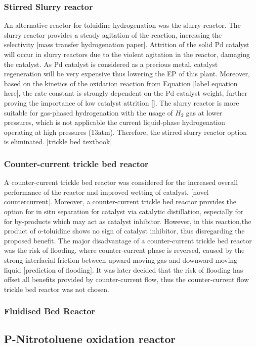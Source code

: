 \subsubsection{Stirred Slurry reactor}
An alternative reactor for toluidine hydrogenation was the slurry reactor. The slurry reactor provides a steady agitation of the reaction, increasing the selectivity [mass transfer hydrogenation paper]. Attrition of the solid Pd catalyst will occur in slurry reactors due to the violent agitation in the reactor, damaging the catalyst. As Pd catalyst is considered as a precious metal, catalyst regeneration will be very expensive thus lowering the EP of this plant. Moreover, based on the kinetics of the oxidation reaction from Equation [label equation here], the rate constant is strongly dependent on the Pd catalyst weight, further proving the importance of low catalyst attrition [].
The slurry reactor is more suitable for gas-phased hydrogenation with the usage of $H_2$ gas at lower pressures, which is not applicable the current liquid-phase hydrogenation operating at high pressures (13atm). Therefore, the stirred slurry reactor option is eliminated. [trickle bed textbook]

\subsubsection{Counter-current trickle bed reactor}
A counter-current trickle bed reactor was considered for the increased overall performance of the reactor and improved wetting of catalyst. [novel countercurrent]. Moreover, a counter-current trickle bed reactor provides the option for in situ separation for catalyst via catalytic distillation, especially for for by-products which may act as catalyst inhibitor. However, in this reaction,the product of o-toluidine shows no sign of catalyst inhibitor, thus disregarding the proposed benefit. The major disadvantage of a counter-current trickle bed reactor was the risk of flooding, where counter-current phase is reversed, caused by the strong interfacial friction between upward moving gas and downward moving liquid [prediction of flooding]. It was later decided that the risk of flooding has offset all benefits provided by counter-current flow, thus the counter-current flow trickle bed reactor was not chosen. 

\subsubsection{Fluidised Bed Reactor}

\subsection{P-Nitrotoluene oxidation reactor}


